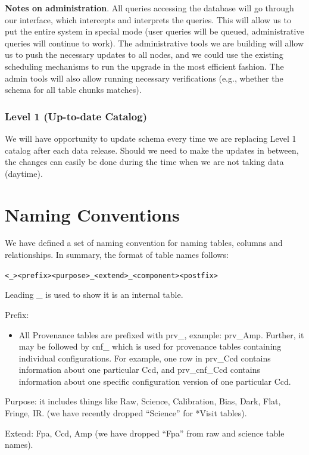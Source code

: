 \documentclass[DM,lsstdraft,toc]{lsstdoc}
\begin{document}
\textbf{Notes on administration}. All queries accessing the database will go through our interface, which intercepts and interprets the queries. This will allow us to put the entire system in special mode (user queries will be queued, administrative queries will continue to work). The administrative tools we are building will allow us to push the necessary updates to all nodes, and we could use the existing scheduling mechanisms to run the upgrade in the most efficient fashion. The admin tools will also allow running necessary verifications (e.g., whether the schema for all table chunks matches).

\subsubsection{Level 1 (Up-to-date Catalog)}

We will have opportunity to update schema every time we are replacing Level 1 catalog after each data release. Should we need to make the updates in between, the changes can easily be done during the time when we are not taking data (daytime).

\section{Naming Conventions}

We have defined a set of naming convention for naming tables, columns and relationships. In summary, the format of table names follows: 

\texttt{<\_><prefix><purpose>\_<extend>\_<component><postfix>}

Leading \_ is used to show it is an internal table.

Prefix:
\begin{itemize}
  \item All Provenance tables are prefixed with prv\_, example: prv\_Amp. Further, it may be followed by cnf\_ which is used for provenance tables containing individual configurations. For example, one row in prv\_Ccd contains information about one particular Ccd, and prv\_cnf\_Ccd contains information about one specific configuration version of one particular Ccd.
\end{itemize}

Purpose: it includes things like Raw, Science, Calibration, Bias, Dark, Flat, Fringe, IR. (we have recently dropped ``Science'' for *Visit tables).

Extend: Fpa, Ccd, Amp (we have dropped ``Fpa'' from raw and science table names).
\end{document}
